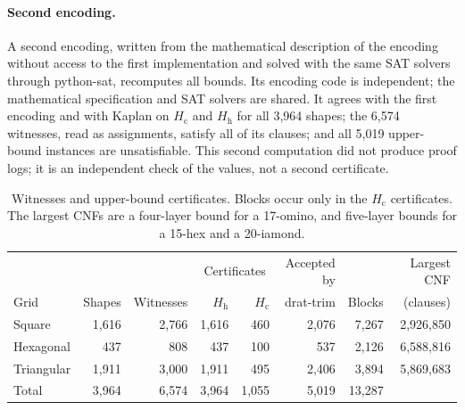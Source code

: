 \documentclass[10pt,a4paper]{article}
\theoremstyle{definition}
\theoremstyle{remark}
\newcommand{\Hc}{H_{\mathrm c}}
\newcommand{\Hh}{H_{\mathrm h}}
\begin{document}
\paragraph{Second encoding.}
A second encoding, written from the mathematical description of the
encoding without access to the first implementation and solved with
the same SAT solvers through python-sat, recomputes all bounds. Its
encoding code is independent; the mathematical specification and SAT
solvers are shared. It
agrees with the first encoding and with Kaplan on $\Hc$ and $\Hh$ for all
3,964 shapes; the 6,574 witnesses, read as assignments, satisfy all of
its clauses; and all 5,019 upper-bound instances are unsatisfiable. This second
computation did not produce proof logs; it is an independent check of the
values, not a second certificate.

\begin{table}[!htbp]
\centering\small
\begin{tabular}{@{}lrrrrrrr@{}}
\toprule
& & & \multicolumn{2}{c}{Certificates} & Accepted by & &
Largest CNF\\
\cmidrule(lr){4-5}
Grid & Shapes & Witnesses & $\Hh$ & $\Hc$ & drat-trim & Blocks &
(clauses)\\
\midrule
Square & 1,616 & 2,766 & 1,616 & 460 & 2,076 & 7,267 & 2,926,850\\
Hexagonal & 437 & 808 & 437 & 100 & 537 & 2,126 & 6,588,816\\
Triangular & 1,911 & 3,000 & 1,911 & 495 & 2,406 & 3,894 & 5,869,683\\
\midrule
Total & 3,964 & 6,574 & 3,964 & 1,055 & 5,019 & 13,287 & \\
\bottomrule
\end{tabular}
\caption{Witnesses and upper-bound certificates. Blocks occur only in
the $\Hc$ certificates. The largest CNFs are a four-layer bound for a
17-omino, and five-layer bounds for a 15-hex and a 20-iamond.}
\label{tab:certs}
\end{table}
\end{document}
